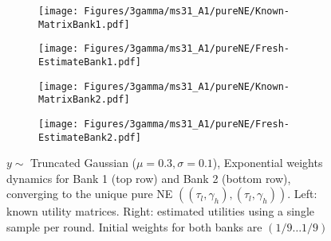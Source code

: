 \begin{figure}[H]
    \centering
    \begin{subfigure}{0.49\linewidth}
        \centering
        \texttt{[image: Figures/3gamma/ms31\_A1/pureNE/Known-MatrixBank1.pdf]}
    \end{subfigure}
    \begin{subfigure}{0.49\linewidth}
        \centering
        \texttt{[image: Figures/3gamma/ms31\_A1/pureNE/Fresh-EstimateBank1.pdf]}
    \end{subfigure}

    \begin{subfigure}{0.49\linewidth}
        \centering
        \texttt{[image: Figures/3gamma/ms31\_A1/pureNE/Known-MatrixBank2.pdf]}
    \end{subfigure}
    \begin{subfigure}{0.49\linewidth}
        \centering
        \texttt{[image: Figures/3gamma/ms31\_A1/pureNE/Fresh-EstimateBank2.pdf]}
    \end{subfigure}
    \caption{$y \sim$  Truncated Gaussian ($\mu=0.3, \sigma=0.1$), Exponential weights dynamics for Bank 1 (top row) and Bank 2 (bottom row), converging to the unique pure NE $((\tau_l, \gamma_h),(\tau_l, \gamma_h))$. Left: known utility matrices. Right: estimated utilities using a single sample per round. Initial weights for both banks are $(1/9 \ldots 1/9)$ \label{fig:dyna-A1}}
\end{figure}


